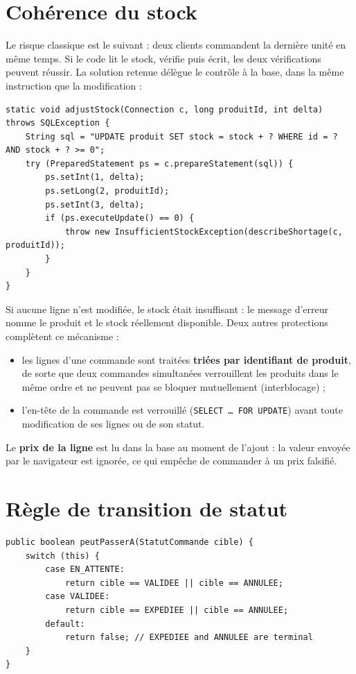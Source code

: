 \documentclass[11pt,a4paper]{report}
\begin{document}
\section{Coh\'erence du stock}
Le risque classique est le suivant : deux clients commandent la derni\`ere unit\'e en m\^eme temps. Si le code lit le stock, v\'erifie puis \'ecrit, les deux v\'erifications peuvent r\'eussir. La solution retenue d\'el\`egue le contr\^ole \`a la base, dans la m\^eme instruction que la modification :

\begin{lstlisting}[language=JavaEE,caption={R\'eservation atomique du stock},label={lst:stock}]
static void adjustStock(Connection c, long produitId, int delta) throws SQLException {
    String sql = "UPDATE produit SET stock = stock + ? WHERE id = ? AND stock + ? >= 0";
    try (PreparedStatement ps = c.prepareStatement(sql)) {
        ps.setInt(1, delta);
        ps.setLong(2, produitId);
        ps.setInt(3, delta);
        if (ps.executeUpdate() == 0) {
            throw new InsufficientStockException(describeShortage(c, produitId));
        }
    }
}
\end{lstlisting}

Si aucune ligne n'est modifi\'ee, le stock \'etait insuffisant : le message d'erreur nomme le produit et le stock r\'eellement disponible. Deux autres protections compl\`etent ce m\'ecanisme :
\begin{itemize}
  \item les lignes d'une commande sont trait\'ees \textbf{tri\'ees par identifiant de produit}, de sorte que deux commandes simultan\'ees verrouillent les produits dans le m\^eme ordre et ne peuvent pas se bloquer mutuellement (interblocage) ;
  \item l'en-t\^ete de la commande est verrouill\'e (\texttt{SELECT \dots{} FOR UPDATE}) avant toute modification de ses lignes ou de son statut.
\end{itemize}

Le \textbf{prix de la ligne} est lu dans la base au moment de l'ajout : la valeur envoy\'ee par le navigateur est ignor\'ee, ce qui emp\^eche de commander \`a un prix falsifi\'e.

\section{R\`egle de transition de statut}
\begin{lstlisting}[language=JavaEE,caption={Transitions autoris\'ees (\texttt{StatutCommande})},label={lst:statut}]
public boolean peutPasserA(StatutCommande cible) {
    switch (this) {
        case EN_ATTENTE:
            return cible == VALIDEE || cible == ANNULEE;
        case VALIDEE:
            return cible == EXPEDIEE || cible == ANNULEE;
        default:
            return false; // EXPEDIEE and ANNULEE are terminal
    }
}
\end{lstlisting}
\end{document}
